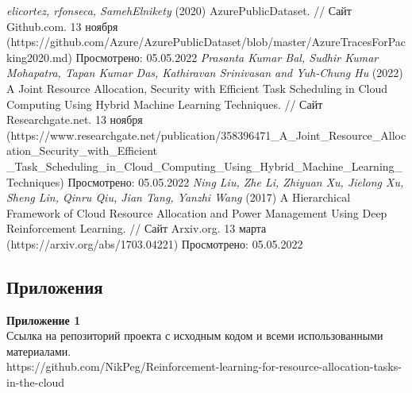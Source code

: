 \documentclass[draft]{article}
\newcommand\zz[1]{\par{\normalsize\strut #1} \hfill\ignorespaces}
\begin{document}
\begin{center}
\begin{thebibliography}{}
 \textit{elicortez, rfonseca, SamehElnikety} (2020) AzurePublicDataset. // Сайт Github.com. 13 ноября (https://github.com/Azure/AzurePublicDataset/blob/master/AzureTracesForPacking2020.md) Просмотрено: 05.05.2022
 \textit{Prasanta Kumar Bal, Sudhir Kumar Mohapatra, Tapan Kumar Das, Kathiravan Srinivasan and Yuh-Chung Hu} (2022) A Joint Resource Allocation, Security with Efficient Task Scheduling in Cloud Computing Using Hybrid Machine Learning Techniques. // Сайт Researchgate.net. 13 ноября (https://www.researchgate.net/publication/358396471\_A\_Joint\_Resource\_Allocation\_Security\_with\_Efficient\\\_Task\_Scheduling\_in\_Cloud\_Computing\_Using\_Hybrid\_Machine\_Learning\_Techniques) Просмотрено: 05.05.2022
 \textit{Ning Liu, Zhe Li, Zhiyuan Xu, Jielong Xu, Sheng Lin, Qinru Qiu, Jian Tang, Yanzhi Wang} (2017) A Hierarchical Framework of Cloud Resource Allocation and Power Management Using Deep Reinforcement Learning. // Сайт Arxiv.org. 13 марта (https://arxiv.org/abs/1703.04221) Просмотрено: 05.05.2022
\end{thebibliography}
\end{center}
\newpage
\begin{center}
\section {Приложения}
\end{center}
\zz{}\textbf{Приложение 1\\}
Ссылка на репозиторий проекта с исходным кодом и всеми использованными материалами.\\
https://github.com/NikPeg/Reinforcement-learning-for-resource-allocation-tasks-in-the-cloud\\
\end{document}
